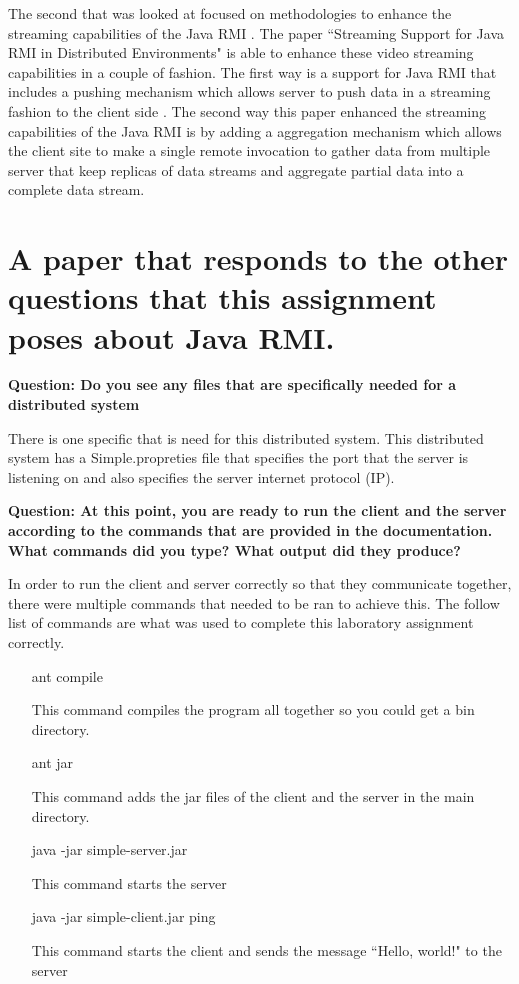 \documentclass{article}
\begin{document}
The second that was looked at focused on methodologies to enhance the streaming capabilities of the Java RMI \cite{Yang:2006:SSJ:1168054.1168063}. The paper ``Streaming Support for Java RMI in Distributed Environments" is able to enhance these video streaming capabilities in a couple of fashion. The first way is a support for Java RMI that includes a pushing mechanism which allows server to push data in a streaming fashion to the client side \cite{Yang:2006:SSJ:1168054.1168063}. The second way this paper enhanced the streaming capabilities of the Java RMI is by adding a aggregation mechanism which allows the client site to make a single remote invocation to gather data from multiple server that keep replicas of data streams and aggregate partial data into a complete data stream\cite{Yang:2006:SSJ:1168054.1168063}.


\section{A paper that responds to the other questions that this assignment poses about Java RMI.}
\textbf{Question: Do you see any files that are specifically needed for a distributed system}

There is one specific that is need for this distributed system. This distributed system has a Simple.propreties file that specifies the port that the server is listening on and also specifies the server internet protocol (IP). 

\textbf{Question: At this point, you are ready to run the client and the server according to the commands that are provided in the documentation. What commands did you type? What output did they produce?}

In order to run the client and server correctly so that they communicate together, there were multiple commands that needed to be ran to achieve this. The follow list of commands are what was used to complete this laboratory assignment correctly.

\begin{itemize}
\item[ant compile]

This command compiles the program all together so you could get a bin directory.

\item[ant jar]

This command adds the jar files of the client and the server in the main directory.

\item[java -jar simple-server.jar]

This command starts the server

\item[java -jar simple-client.jar ping]

This command starts the client and sends the message ``Hello, world!" to the server

\end{itemize}
 
\end{document}
